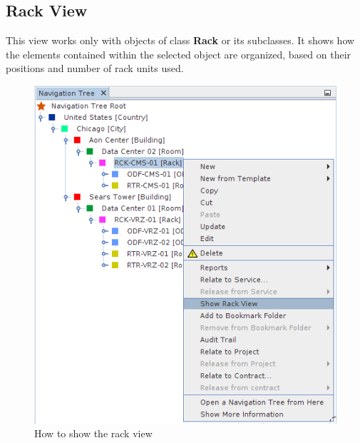 \documentclass[a4paper]{article}
\begin{document}
		\subsection{Rack View} \label{sec:rack_view}
		This view works only with objects of class \textbf{Rack} or its subclasses. It shows how the elements contained within the selected object are organized, based on their positions and number of rack units used. 
		\begin{figure}[h!]
			\centering
			\includegraphics[width=0.5\linewidth]{img/show_rack_view.png}
			\caption{How to show the rack view}
			\label{fig:rack_view_combobox}
		\end{figure}
		
\end{document}

